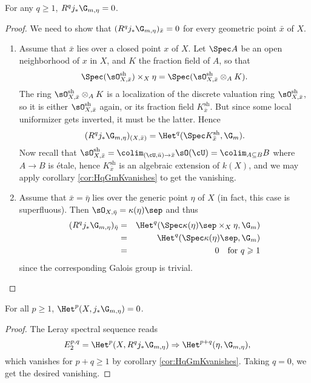 \begin{lem}
For any $q \geqslant 1$, $R^q j_*\G_{m,\eta} = 0$.
\end{lem}

\begin{proof}
We need to show that $(R^q j_*\G_{m,\eta})_{\bar x} = 0$ for every geometric point $\bar x$ of $X$. 
\begin{enumerate}[\it Step 1.]
\item
Assume that $\bar x$ lies over a closed point $x$ of $X$. Let $\Spec A$ be an open neighborhood of $x$ in $X$, and $K$ the fraction field of $A$, so that
$$
\Spec(\sO^\text{sh}_{X,\bar x}) \times_X \eta = \Spec(\sO^\text{sh}_{X,\bar x} \otimes_A K).
$$
The ring $\sO^\text{sh}_{X,\bar x} \otimes_A K$ is a localization of the discrete valuation ring $\sO^\text{sh}_{X,\bar x}$, so it is either $\sO^\text{sh}_{X,\bar x}$ again, or its fraction field $K^\text{sh}_{\bar x}$. But since some local uniformizer gets inverted, it must be the latter. Hence
$$
(R^q j_*\G_{m,\eta})_{(X, \bar x)} = \Het^q(\Spec K^\text{sh}_{\bar x}, \G_m).
$$
Now recall that $\sO^\text{sh}_{X, \bar x} = \colim_{(\cU,\bar u) \to \bar x} \sO (\cU) = \colim_{A \subseteq B} B$ where $A \to B$ is \'etale, hence $K^\text{sh}_{\bar x}$ is an algebraic extension of $k(X)$, and we may apply corollary \ref{cor:HqGmKvanishes} to get the vanishing.
\item
Assume that $\bar x = \bar \eta$ lies over the generic point $\eta$ of $X$ (in fact, this case is superfluous). Then $\sO_{X,\bar \eta} = \kappa(\eta)\sep$ and thus
\begin{eqnarray*}
(R^q j_*\G_{m,\eta})_{\bar \eta}  & = & \Het^q(\Spec \kappa(\eta)\sep \times_X \eta, \G_m) \\
& = & \Het^q (\Spec \kappa(\eta)\sep, \G_m)  \\
& = & 0 \ \ \text{ for } q \geqslant 1
\end{eqnarray*}
since the corresponding Galois group is trivial.
\end{enumerate}
\end{proof}

\begin{lem}
For all $p \geqslant 1$, $\Het^p(X, j_*\G_{m,\eta}) = 0$.
\end{lem}

\begin{proof}
The Leray spectral sequence reads
$$
E_2^{p,q} = \Het^p(X, R^qj_*\G_{m,\eta}) \Rightarrow \Het^{p+q}(\eta, \G_{m,\eta}),
$$
which vanishes for $p+q \geqslant 1$ by corollary \ref{cor:HqGmKvanishes}. Taking $q = 0$, we get the desired vanishing.
\end{proof}

